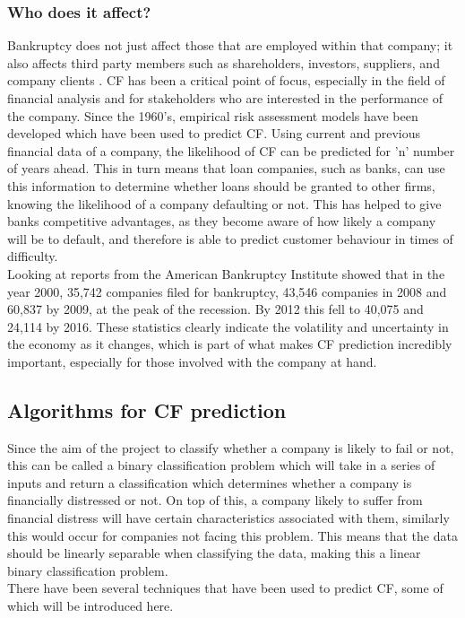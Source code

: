 \documentclass[11pt]{article}
\begin{document}
\subsubsection{Who does it affect?}
Bankruptcy does not just affect those that are employed within that company; it also affects third party members such as shareholders, investors, suppliers, and company clients . CF has been a critical point of focus, especially in the field of financial analysis and for stakeholders who are interested in the performance of the company. Since the 1960's, empirical risk assessment models have been developed which have been used to predict CF. Using current and previous financial data of a company, the likelihood of CF can be predicted for 'n' number of years ahead. This in turn means that loan companies, such as banks, can use this information to determine whether loans should be granted to other firms, knowing the likelihood of a company defaulting or not. This has helped to give banks competitive advantages, as they become aware of how likely a company will be to default, and therefore is able to predict customer behaviour in times of difficulty.\\
Looking at reports from the American Bankruptcy Institute showed that in the year 2000, 35,742 companies filed for bankruptcy, 43,546 companies in 2008 and 60,837 by 2009, at the peak of the recession. By 2012 this fell to 40,075 and 24,114 by 2016. These statistics clearly indicate the volatility and uncertainty in the economy as it changes, which is part of what makes CF prediction incredibly important, especially for those involved with the company at hand.


\subsection{Algorithms for CF prediction}
Since the aim of the project to classify whether a company is likely to fail or not, this can be called a binary classification problem which will take in a series of inputs and return a classification which determines whether a company is financially distressed or not. On top of this, a company likely to suffer from financial distress will have certain characteristics associated with them, similarly this would occur for companies not facing this problem. This means that the data should be linearly separable when classifying the data, making this a linear binary classification problem. \\
There have been several techniques that have been used to predict CF, some of which will be introduced here. 
\end{document}
